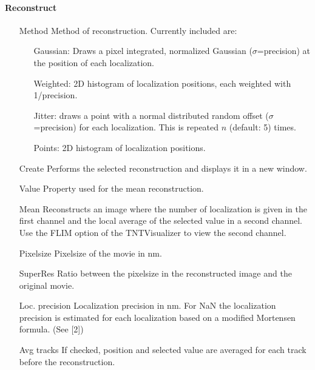 \documentclass[11pt,onside]{report}
\numberwithin{equation}{chapter}
\begin{document}
\paragraph{Reconstruct}
\begin{itemize}[leftmargin=3cm]
\item[\textsf{Method}] Method of reconstruction. Currently included are:
\begin{itemize}
\item[] Gaussian: Draws a pixel integrated, normalized Gaussian ($\sigma$=precision) at the position of each localization.
\item[] Weighted: 2D histogram of localization positions, each weighted with 1/precision.
\item[] Jitter: draws a point with a normal distributed random offset ($\sigma$=precision) for each localization. This is repeated $n$ (default: 5) times.
\item[] Points: 2D histogram of localization positions.
\end{itemize}
\item[\textsf{Create}] Performs the selected reconstruction and displays it in a new window.
\item[\textsf{Value}] Property used for the mean reconstruction.
\item[\textsf{Mean}] Reconstructs an image where the number of localization is given in the first channel and the local average of the selected value in a second channel. Use the \textsf{FLIM} option of the \textsf{TNTVisualizer} to view the second channel.
\item[\textsf{Pixelsize}] Pixelsize of the movie in nm.
\item[\textsf{SuperRes}] Ratio between the pixelsize in the reconstructed image and the original movie.
\item[\textsf{Loc. precision}] Localization precision in nm. For NaN the localization precision is estimated for each localization based on a modified Mortensen formula. (See [2])
\item[\textsf{Avg tracks}] If checked, position and selected value are averaged for each track before the reconstruction.
\end{itemize}
\end{document}

